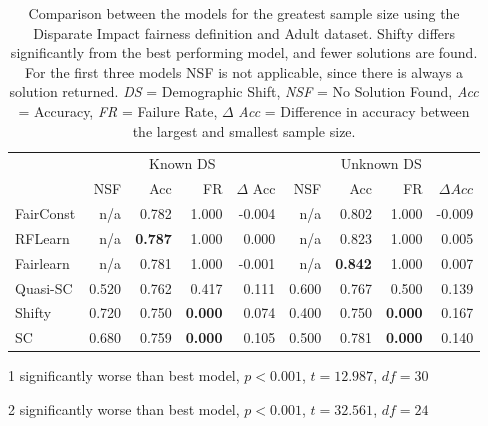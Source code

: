 \begin{table}[H]
\begin{threeparttable}
\centering
\begin{tabular}{lrrrrrrrr}
\toprule
 & \multicolumn{4}{c}{Known DS} & \multicolumn{4}{c}{Unknown DS} \\
 & NSF & Acc & FR & $\Delta$ Acc & NSF & Acc & FR & $\Delta Acc$ \\
\cmidrule(r){2-5} \cmidrule{6-9}
FairConst & n/a & 0.782 & 1.000 & -0.004 & n/a & 0.802 & 1.000 & -0.009 \\
RFLearn & n/a & \bfseries 0.787 & 1.000 & 0.000 & n/a & 0.823 & 1.000 & 0.005 \\
Fairlearn & n/a & 0.781 & 1.000 & -0.001 & n/a & \bfseries 0.842 & 1.000 & 0.007 \\
Quasi-SC & 0.520 & 0.762 & 0.417 & 0.111 & 0.600 & 0.767 & 0.500 & 0.139 \\
Shifty & 0.720 & 0.750\tnote{1} & \bfseries 0.000 & 0.074 & 0.400 & 0.750\tnote{2} & \bfseries 0.000 & 0.167 \\
SC & 0.680 & 0.759 & \bfseries 0.000 & 0.105 & 0.500 & 0.781 & \bfseries 0.000 & 0.140 \\
\bottomrule
\end{tabular}
\begin{tablenotes}
\item[1] significantly worse than best model, $p<0.001$, $t=12.987$, $df=30$
\item[2] significantly worse than best model, $p<0.001$, $t=32.561$, $df=24$
\end{tablenotes}
\end{threeparttable}
\caption{Comparison between the models for the greatest sample size using the Disparate Impact fairness definition and Adult dataset. Shifty differs significantly from the best performing model, and fewer solutions are found. For the first three models NSF is not applicable, since there is always a solution returned. \textit{DS} = Demographic Shift, \textit{NSF} = No Solution Found, \textit{Acc} = Accuracy, \textit{FR} = Failure Rate, $\Delta$ \textit{Acc} = Difference in accuracy between the largest and smallest sample size.}
\label{diadult}
\end{table}



